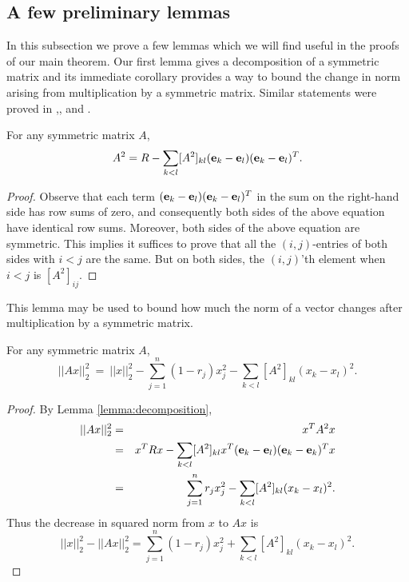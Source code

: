 \documentclass[final]{siamltex}
\begin{document}
\subsection{A few preliminary lemmas\label{subsec:aclass}} In this subsection we prove a few lemmas which we will find useful in the proofs of our main theorem. Our first lemma gives a decomposition of a symmetric matrix and its immediate corollary provides a way to bound the change in norm arising from multiplication by a symmetric matrix. Similar statements were proved in \cite{bdx04},\cite{noot09}, and \cite{TN11}. 

\smallskip

\begin{lemma} For any symmetric matrix $A$,  \[ A^2 = {{{R}}} - \sum_{k<l} [A^2]_{kl} ({{\bf e}}_k - {{\bf e}}_l) ({{\bf e}}_k - {{\bf e}}_l)^T.\] \label{lemma:decomposition} \end{lemma}

\begin{proof} Observe that each term $({{\bf e}}_k - {{\bf e}}_l) ({{\bf e}}_k - {{\bf e}}_l)^T$ in the sum on the right-hand side has row sums of zero, and consequently both sides of the above equation have identical row sums. Moreover, both sides of the above equation are symmetric. This implies it suffices to prove that all the $(i,j)$-entries of both sides
with $i<j$ are the same. But on both sides, the $(i,j)$'th element when $i<j$ is $[A^2]_{ij}$.  \end{proof}

\smallskip

{{{This lemma may be used to bound how much the norm of a vector changes after multiplication by a symmetric matrix.}}}

\smallskip

\begin{corollary} \label{sievebound} For any symmetric matrix $A$,
\[ ||Ax||_2^2  ~=~  ||x||_2^2 - \sum_{j=1}^n (1-r_j) x_j^2 {{{-}}} \sum_{k<l} [A^2]_{kl}(x_k - x_l)^2.  \]    \end{corollary}

\begin{proof} By Lemma \ref{lemma:decomposition}, \begin{eqnarray*} ||Ax||_2^2 & = & 
 x^T A^2 x \\
& = & x^T R x - \sum_{k<l} [A^2]_{kl} x^T ({{\bf e}}_k - {{\bf e}}_l) ({{\bf e}}_k - {{\bf e}}_k)^T x \\
& = & \sum_{j=1}^n r_j x_j^2 - \sum_{k<l} [A^2]_{kl} (x_k - x_l)^2. 
\end{eqnarray*} Thus the decrease in squared norm from $x$ to $Ax$ is 
\[ ||x||_2^2 - ||Ax||_2^2 = \sum_{j=1}^n (1-r_j) x_j^2 + \sum_{k<l} [A^2]_{kl}(x_k - x_l)^2. \] \end{proof}
\end{document}
